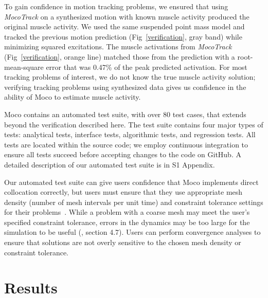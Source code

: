 \documentclass[10pt,letterpaper]{article}
\begin{document}
To gain confidence in motion tracking problems, we ensured that using \textit{MocoTrack} on a synthesized motion with known muscle activity produced the original muscle activity. We used the same suspended point mass model and tracked the previous motion prediction (Fig~\ref{verification}, gray band) while minimizing squared excitations. The muscle activations from \textit{MocoTrack} (Fig~\ref{verification}, orange line) matched those from the prediction with a root-mean-square error that was 0.47\% of the peak predicted activation. For most tracking problems of interest, we do not know the true muscle activity solution; verifying tracking problems using synthesized data gives us confidence in the ability of Moco to estimate muscle activity.

Moco contains an automated test suite, with over 80 test cases, that extends beyond the verification described here. The test suite contains four major types of tests: analytical tests, interface tests, algorithmic tests, and regression tests. All tests are located within the source code; we employ continuous integration to ensure all tests succeed before accepting changes to the code on GitHub. A detailed description of our automated test suite is in S1 Appendix.

Our automated test suite can give users confidence that Moco implements direct collocation correctly, but users must ensure that they use appropriate mesh density (number of mesh intervals per unit time) and constraint tolerance settings for their problems~\cite{Hicks:2015bo}. While a problem with a coarse mesh may meet the user's specified constraint tolerance, errors in the dynamics may be too large for the simulation to be useful (\hspace{1sp}\cite{Betts:2010}, section 4.7). Users can perform convergence analyses to ensure that solutions are not overly sensitive to the chosen mesh density or constraint tolerance.

\section*{Results}
\end{document}
